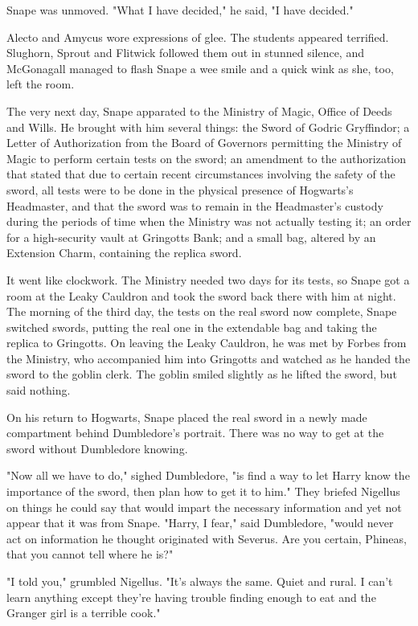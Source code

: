 Snape was unmoved. "What I have decided," he said, "I have decided."

Alecto and Amycus wore expressions of glee. The students appeared terrified. Slughorn, Sprout and Flitwick followed them out in stunned silence, and McGonagall managed to flash Snape a wee smile and a quick wink as she, too, left the room.

The very next day, Snape apparated to the Ministry of Magic, Office of Deeds and Wills. He brought with him several things: the Sword of Godric Gryffindor; a Letter of Authorization from the Board of Governors permitting the Ministry of Magic to perform certain tests on the sword; an amendment to the authorization that stated that due to certain recent circumstances involving the safety of the sword, all tests were to be done in the physical presence of Hogwarts's Headmaster, and that the sword was to remain in the Headmaster's custody during the periods of time when the Ministry was not actually testing it; an order for a high-security vault at Gringotts Bank; and a small bag, altered by an Extension Charm, containing the replica sword.

It went like clockwork. The Ministry needed two days for its tests, so Snape got a room at the Leaky Cauldron and took the sword back there with him at night. The morning of the third day, the tests on the real sword now complete, Snape switched swords, putting the real one in the extendable bag and taking the replica to Gringotts. On leaving the Leaky Cauldron, he was met by Forbes from the Ministry, who accompanied him into Gringotts and watched as he handed the sword to the goblin clerk. The goblin smiled slightly as he lifted the sword, but said nothing.

On his return to Hogwarts, Snape placed the real sword in a newly made compartment behind Dumbledore's portrait. There was no way to get at the sword without Dumbledore knowing.

"Now all we have to do," sighed Dumbledore, "is find a way to let Harry know the importance of the sword, then plan how to get it to him." They briefed Nigellus on things he could say that would impart the necessary information and yet not appear that it was from Snape. "Harry, I fear," said Dumbledore, "would never act on information he thought originated with Severus. Are you certain, Phineas, that you cannot tell where he is?"

"I told you," grumbled Nigellus. "It's always the same. Quiet and rural. I can't learn anything except they're having trouble finding enough to eat and the{\el} Granger girl is a terrible cook."

